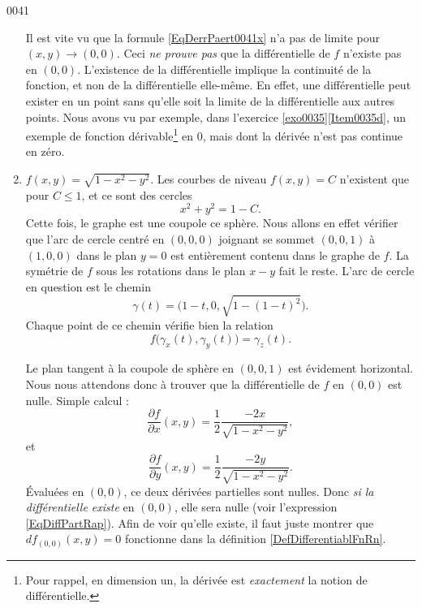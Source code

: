 \begin{corrige}{0041}
\begin{enumerate}
\begin{remark}	\label{Rem0041DiffExCon}
Il est vite vu que la formule \eqref{EqDerrPaert0041x} n'a pas de limite pour $(x,y)\to(0,0)$. Ceci \emph{ne prouve pas} que la différentielle de $f$ n'existe pas en $(0,0)$. L'existence de la différentielle implique la continuité de la fonction, et non de la différentielle elle-même. En effet, une différentielle peut exister en un point sans qu'elle soit la limite de la différentielle aux autres points. Nous avons vu par exemple, dans l'exercice \ref{exo0035}\ref{Item0035d}, un exemple de fonction dérivable\footnote{Pour rappel, en dimension un, la dérivée est \emph{exactement} la notion de différentielle.} en $0$, mais dont la dérivée n'est pas continue en zéro.
\end{remark}


\item
$f(x,y)=\sqrt{1-x^2-y^2}$. Les courbes de niveau $f(x,y)=C$ n'existent que pour $C\leq 1$, et ce sont des cercles
\begin{equation}
	x^2+y^2=1-C.
\end{equation}
Cette fois, le graphe est une coupole ce sphère. Nous allons en effet vérifier que l'arc de cercle centré en $(0,0,0)$ joignant se sommet $(0,0,1)$ à $(1,0,0)$ dans le plan $y=0$ est entièrement contenu dans le graphe de $f$. La symétrie de $f$ sous les rotations dans le plan $x-y$ fait le reste. L'arc de cercle en question est le chemin
\begin{equation}
	\gamma(t)=\big( 1-t,0,\sqrt{1-(1-t)^2} \big).
\end{equation}
Chaque point de ce chemin vérifie bien la relation
\begin{equation}
	f\big( \gamma_x(t),\gamma_y(t) \big)=\gamma_z(t).
\end{equation}

Le plan tangent à la coupole de sphère en $(0,0,1)$ est évidement horizontal. Nous nous attendons donc à trouver que la différentielle de $f$ en $(0,0)$ est nulle. Simple calcul :
\begin{equation}
	\frac{ \partial f }{ \partial x }(x,y)=\frac{ 1 }{2}\frac{ -2x }{ \sqrt{1-x^2-y^2} },
\end{equation}
et 
\begin{equation}
	\frac{ \partial f }{ \partial y }(x,y)=\frac{ 1 }{2}\frac{ -2y }{ \sqrt{1-x^2-y^2} }.
\end{equation}
Évaluées en $(0,0)$, ce deux dérivées partielles sont nulles. Donc \emph{si la différentielle existe} en $(0,0)$, elle sera nulle (voir l'expression \eqref{EqDiffPartRap}). Afin de voir qu'elle existe, il faut juste montrer que $df_{(0,0)}(x,y)=0$ fonctionne dans la définition \ref{DefDifferentiablFnRn}.


\end{enumerate}
\end{corrige}
